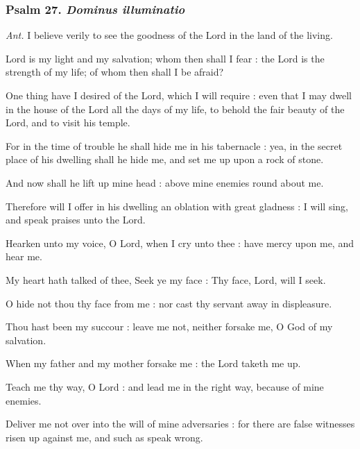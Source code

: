 \subsubsection{Psalm 27. \textit{Dominus illuminatio}}\par\noindent
\textit{Ant.} I believe {\dag} verily to see the goodness of the Lord in the land of the living.\par
{} Lord is my light and my salvation; whom then shall I fear : the Lord is the strength of my life; of whom then shall I be afraid?\par
{}
One thing have I desired of the Lord, which I will require : even that I may dwell in the house of the Lord all the days of my life, to behold the fair beauty of the Lord, and to visit his temple.\par
{}For in the time of trouble he shall hide me in his tabernacle : yea, in the secret place of his dwelling shall he hide me, and set me up upon a rock of stone.\par
{}And now shall he lift up mine head : above mine enemies round about me.\par
{}Therefore will I offer in his dwelling an oblation with great gladness : I will sing, and speak praises unto the Lord.\par
{}Hearken unto my voice, O Lord, when I cry unto thee : have mercy upon me, and hear me.\par
{}My heart hath talked of thee, Seek ye my face : Thy face, Lord, will I seek.\par
{}O hide not thou thy face from me : nor cast thy servant away in displeasure.\par
{}Thou hast been my succour : leave me not, neither forsake me, O God of my salvation.\par
{}When my father and my mother forsake me : the Lord taketh me up.\par
{}Teach me thy way, O Lord : and lead me in the right way, because of mine enemies.\par
{}Deliver me not over into the will of mine adversaries : for there are false witnesses risen up against me, and such as speak wrong.\par
